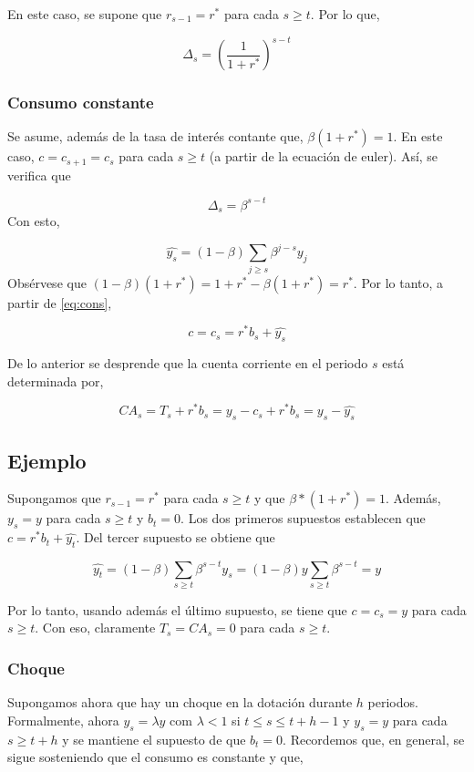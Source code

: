 \documentclass[]{article}
\begin{document}
En este caso, se supone que \(r_{s-1} = r^*\) para cada \(s \geq t\).
Por lo que,

\[
\Delta_s = \left(\frac{1}{1 + r^*}\right)^{s-t}
\]

\subsubsection{Consumo constante}\label{consumo-constante}

Se asume, además de la tasa de interés contante que,
\(\beta(1+r^*) = 1\). En este caso, \(c = c_{s+1} = c_{s}\) para cada
\(s \geq t\) (a partir de la ecuación de euler). Así, se verifica que

\[
\Delta_s = \beta^{s-t}
\] Con esto,

\[
\hat{y_s} = (1-\beta)\sum_{j \geq s}\beta^{j-s}y_j
\] Obsérvese que \((1-\beta)(1+r^*) = 1 + r^* - \beta(1+r^*) = r^*\).
Por lo tanto, a partir de \eqref{eq:cons},

\[
c = c_s = r^*b_s + \hat{y_s}
\]

De lo anterior se desprende que la cuenta corriente en el periodo \(s\)
está determinada por,

\[
CA_s = T_s + r^*b_s =  y_s - c_s + r^*b_s = y_s - \hat{y_s} 
\]

\subsection{Ejemplo}\label{ejemplo}

Supongamos que \(r_{s-1} = r^*\) para cada \(s \geq t\) y que
\(\beta*(1+r^*) = 1\). Además, \(y_s = y\) para cada \(s\geq t\) y
\(b_t = 0\). Los dos primeros supuestos establecen que
\(c = r^*b_t + \hat{y_t}\). Del tercer supuesto se obtiene que

\[
\hat{y_t} = (1-\beta)\sum_{s\geq t} \beta^{s-t} y_s = (1-\beta)y \sum_{s\geq t} \beta^{s-t} = y
\]

Por lo tanto, usando además el último supuesto, se tiene que
\(c = c_s = y\) para cada \(s \geq t\). Con eso, claramente
\(T_s = CA_s = 0\) para cada \(s\geq t\).

\subsubsection{Choque}\label{choque}

Supongamos ahora que hay un choque en la dotación durante \(h\)
periodos. Formalmente, ahora \(y_s = \lambda y\) com \(\lambda < 1\) si
\(t \leq s \leq t+h-1\) y \(y_s = y\) para cada \(s \geq t+h\) y se
mantiene el supuesto de que \(b_t = 0\). Recordemos que, en general, se
sigue sosteniendo que el consumo es constante y que,
\end{document}
